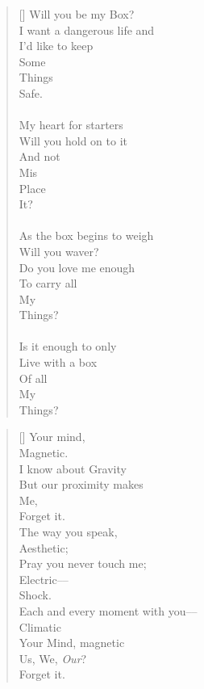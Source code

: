 \documentclass{article}
\begin{document}
\settowidth{\versewidth}{Than Tycho Brahe, or Erra Pater:}
\begin{verse}[\versewidth]
Will you be my Box? \\
I want a dangerous life and \\
I'd like to keep \\
Some \\
Things \\
Safe. \\
\\
My heart for starters \\
Will you hold on to it \\
And not \\
Mis \\
Place \\
It? \\
\\
As the box begins to weigh \\
Will you waver? \\
Do you love me enough \\
To carry all \\
My \\
Things? \\
\\
Is it enough to only \\
Live with a box \\
Of all \\
My \\
Things? \\
\end{verse}

\settowidth{\versewidth}{Than Tycho Brahe, or Erra Pater:}
\begin{verse}[\versewidth]
Your mind, \\
Magnetic. \\
I know about Gravity \\
But our proximity makes \\
Me, \\
Forget it. \\
The way you speak, \\
Aesthetic; \\
Pray you never touch me; \\
Electric–– \\
Shock. \\
Each and every moment with you–– \\
Climatic \\
Your Mind, magnetic \\
Us, We, \textit{Our}? \\
Forget it. \\
\end{verse}
\end{document}

